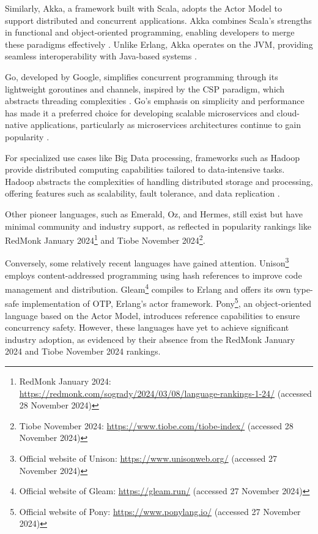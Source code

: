 Similarly, Akka, a framework built with Scala, adopts the Actor Model to support distributed and concurrent applications. Akka combines Scala’s strengths in functional and object-oriented programming, enabling developers to merge these paradigms effectively \cite{Valkov2018}. Unlike Erlang, Akka operates on the \gls{JVM}, providing seamless interoperability with Java-based systems \cite{Abraham2023}.

Go, developed by Google, simplifies concurrent programming through its lightweight goroutines and channels, inspired by the \gls{CSP} paradigm, which abstracts threading complexities \cite{Brolos2021}. Go’s emphasis on simplicity and performance has made it a preferred choice for developing scalable microservices and cloud-native applications, particularly as microservices architectures continue to gain popularity \cite{go-docs}.

For specialized use cases like Big Data processing, frameworks such as Hadoop provide distributed computing capabilities tailored to data-intensive tasks. Hadoop abstracts the complexities of handling distributed storage and processing, offering features such as scalability, fault tolerance, and data replication \cite{Polato2014}.

Other pioneer languages, such as Emerald, Oz, and Hermes, still exist but have minimal community and industry support, as reflected in popularity rankings like RedMonk January 2024\footnote{RedMonk January 2024: \url{https://redmonk.com/sogrady/2024/03/08/language-rankings-1-24/} (accessed 28 November 2024)} and Tiobe November 2024\footnote{Tiobe November 2024: \url{https://www.tiobe.com/tiobe-index/} (accessed 28 November 2024)}.

Conversely, some relatively recent languages have gained attention. Unison\footnote{Official website of Unison: \url{https://www.unisonweb.org/} (accessed 27 November 2024)} employs content-addressed programming using hash references to improve code management and distribution. Gleam\footnote{Official website of Gleam: \url{https://gleam.run/} (accessed 27 November 2024)} compiles to Erlang and offers its own type-safe implementation of \gls{OTP}, Erlang’s actor framework. Pony\footnote{Official website of Pony: \url{https://www.ponylang.io/} (accessed 27 November 2024)}, an object-oriented language based on the Actor Model, introduces reference capabilities to ensure concurrency safety. However, these languages have yet to achieve significant industry adoption, as evidenced by their absence from the RedMonk January 2024 and Tiobe November 2024 rankings.

